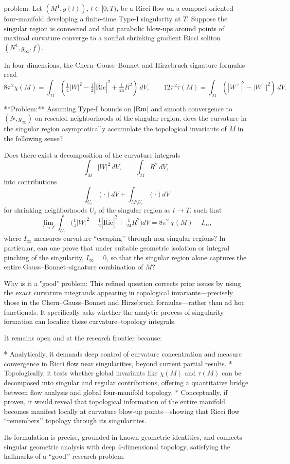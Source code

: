 problem:  
Let $(M^4,g(t))$, $t\in[0,T)$, be a Ricci flow on a compact oriented four‑manifold developing a finite‑time Type‑I singularity at $T$. Suppose the singular region is connected and that parabolic blow‑ups around points of maximal curvature converge to a nonflat shrinking gradient Ricci soliton $(N^4,g_\infty,f)$.  

In four dimensions, the Chern–Gauss–Bonnet and Hirzebruch signature formulas read
\[
8\pi^2 \chi(M)=\int_M \left(\tfrac14|W|^2-\tfrac12|\mathring{\text{Ric}}|^2+\tfrac{1}{24}R^2\right)\, dV,
\qquad
12\pi^2 \tau(M)=\int_M(|W^+|^2-|W^-|^2)\, dV.
\]
  
**Problem:**  
Assuming Type‑I bounds on $|{\rm Rm}|$ and smooth convergence to $(N,g_\infty)$ on rescaled neighborhoods of the singular region, does the curvature in the singular region asymptotically accumulate the topological invariants of $M$ in the following sense?  

Does there exist a decomposition of the curvature integrals
\[
\int_M |W|^2\,dV,\qquad \int_M R^2\,dV,
\]
into contributions
\[
\int_{U_t}(\cdot)dV+\int_{M\setminus U_t}(\cdot)dV
\]
for shrinking neighborhoods $U_t$ of the singular region as $t\to T$, such that  
\[
\lim_{t\to T}\int_{U_t} \Big(\tfrac14|W|^2-\tfrac12|\mathring{\text{Ric}}|^2+\tfrac{1}{24} R^2\Big)dV
= 8\pi^2\,\chi(M)-I_\infty,
\]
where $I_\infty$ measures curvature “escaping’’ through non‑singular regions?  
In particular, can one prove that under suitable geometric isolation or integral pinching of the singularity, $I_\infty=0$, so that the singular region alone captures the entire Gauss–Bonnet–signature combination of $M$?  

Why is it a "good" problem:  
This refined question corrects prior issues by using the exact curvature integrands appearing in topological invariants—precisely those in the Chern–Gauss–Bonnet and Hirzebruch formulas—rather than ad hoc functionals. It specifically asks whether the analytic process of singularity formation can localize these curvature–topology integrals.  

It remains open and at the research frontier because:

* Analytically, it demands deep control of curvature concentration and measure convergence in Ricci flow near singularities, beyond current partial results.  
* Topologically, it tests whether global invariants like $\chi(M)$ and $\tau(M)$ can be decomposed into singular and regular contributions, offering a quantitative bridge between flow analysis and global four‑manifold topology.  
* Conceptually, if proven, it would reveal that topological information of the entire manifold becomes manifest locally at curvature blow‑up points—showing that Ricci flow “remembers’’ topology through its singularities.

Its formulation is precise, grounded in known geometric identities, and connects singular geometric analysis with deep 4‑dimensional topology, satisfying the hallmarks of a “good’’ research problem.